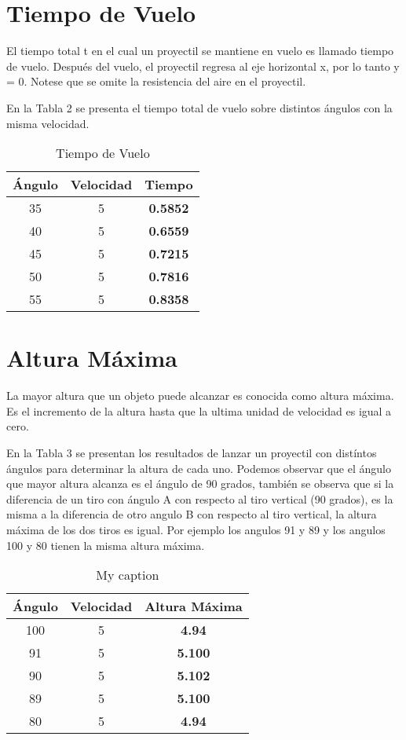 \documentclass{article}
\begin{document}
\section{Tiempo de Vuelo}

    El tiempo total t en el cual un proyectil se mantiene en vuelo es llamado tiempo de vuelo. Después del vuelo, el proyectil regresa al eje horizontal x, por lo tanto y = 0. Notese que se omite la resistencia del aire en el proyectil.
    
    En la Tabla 2 se presenta el tiempo total de vuelo sobre distintos ángulos con la misma velocidad.

\begin{table}[]
\centering
\caption{Tiempo de Vuelo}
\label{my-label}
\begin{tabular}{ccc}
\hline
Ángulo & Velocidad & \textbf{Tiempo} \\ \hline
35     & 5         & \textbf{0.5852} \\ \hline
40     & 5         & \textbf{0.6559} \\ \hline
45     & 5         & \textbf{0.7215} \\ \hline
50     & 5         & \textbf{0.7816} \\ \hline
55     & 5         & \textbf{0.8358} \\ \hline
\end{tabular}
\end{table}


\section{Altura Máxima}

La mayor altura que un objeto puede alcanzar es conocida como altura máxima. Es el incremento de la altura hasta que la ultima unidad de velocidad es igual a cero.

En la Tabla 3 se presentan los resultados de lanzar un proyectil con distíntos ángulos para determinar la altura de cada uno. Podemos observar que el ángulo que mayor altura alcanza es el ángulo de 90 grados, también se observa que si la diferencia de un tiro con ángulo A con respecto al tiro vertical (90 grados), es la misma a la diferencia de otro angulo B con respecto al tiro vertical, la altura máxima de los dos tiros es igual. Por ejemplo los angulos 91 y 89 y los angulos 100 y 80 tienen la misma altura máxima.

\begin{table}[]
\centering
\caption{My caption}
\label{my-label}
\begin{tabular}{ccc}
\hline
Ángulo & Velocidad & \textbf{Altura Máxima} \\ \hline
100    & 5         & \textbf{4.94}          \\ \hline
91     & 5         & \textbf{5.100}         \\ \hline
90     & 5         & \textbf{5.102}         \\ \hline
89     & 5         & \textbf{5.100}         \\ \hline
80     & 5         & \textbf{4.94}          \\ \hline
\end{tabular}
\end{table}
\end{document}
